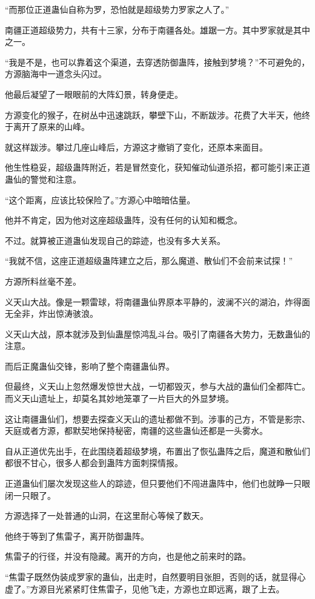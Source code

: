 \begin{this_body}
“而那位正道蛊仙自称为罗，恐怕就是超级势力罗家之人了。”

南疆正道超级势力，共有十三家，分布于南疆各处。雄踞一方。其中罗家就是其中之一。

“我是不是，也可以靠着这个渠道，去穿透防御蛊阵，接触到梦境？”不可避免的，方源脑海中一道念头闪过。

他最后凝望了一眼眼前的大阵幻景，转身便走。

方源变化的猴子，在树丛中迅速跳跃，攀壁下山，不断跋涉。花费了大半天，他终于离开了原来的山峰。

就这样跋涉。攀过几座山峰后，方源这才撤销了变化，还原本来面目。

他生性稳妥，超级蛊阵附近，若是冒然变化，获知催动仙道杀招，都可能引来正道蛊仙的警觉和注意。

“这个距离，应该比较保险了。”方源心中暗暗估量。

他并不肯定，因为他对这座超级蛊阵，没有任何的认知和概念。

不过。就算被正道蛊仙发现自己的踪迹，也没有多大关系。

“我就不信，这座正道超级蛊阵建立之后，那么魔道、散仙们不会前来试探！”

方源所料丝毫不差。

义天山大战。像是一颗雷球，将南疆蛊仙界原本平静的，波澜不兴的湖泊，炸得面无全非，炸出惊涛骇浪。

义天山大战，原本就涉及到仙蛊屋惊鸿乱斗台。吸引了南疆各大势力，无数蛊仙的注意。

而后正魔蛊仙交锋，影响了整个南疆蛊仙界。

但最终，义天山上忽然爆发惊世大战，一切都毁灭，参与大战的蛊仙们全都阵亡。而义天山遗址上，却莫名其妙地笼罩了一片巨大的外显梦境。

这让南疆蛊仙们，想要去探查义天山的遗址都做不到。涉事的己方，不管是影宗、天庭或者方源，都默契地保持秘密，南疆的这些蛊仙还都是一头雾水。

自从正道优先出手，在此围绕着超级梦境，布置出了恢弘蛊阵之后，魔道和散仙们都很不甘心，很多人都会到蛊阵方面刺探情报。

正道蛊仙们屡次发现这些人的踪迹，但只要他们不闯进蛊阵中，他们也就睁一只眼闭一只眼了。

方源选择了一处普通的山洞，在这里耐心等候了数天。

他终于等到了焦雷子，离开防御蛊阵。

焦雷子的行径，并没有隐藏。离开的方向，也是他之前来时的路。

“焦雷子既然伪装成罗家的蛊仙，出走时，自然要明目张胆，否则的话，就显得心虚了。”方源目光紧紧盯住焦雷子，见他飞走，方源也立即远离，跟了上去。


\end{this_body}
